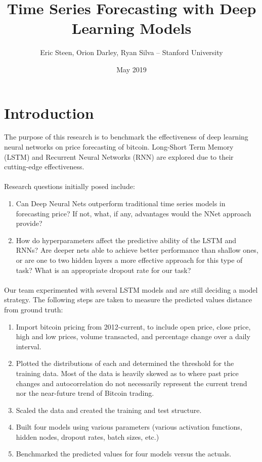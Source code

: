 \documentclass{article}
\title{Time Series Forecasting with Deep Learning Models}
\author{Eric Steen, Orion Darley, Ryan Silva – Stanford University }
\date{May 2019}
\begin{document}
\maketitle

\section{Introduction}
The purpose of this research is to benchmark the effectiveness of deep learning neural networks on price forecasting of bitcoin. Long-Short Term Memory (LSTM) and Recurrent Neural Networks (RNN) are explored due to their cutting-edge effectiveness.

\paragraph{}
Research questions initially posed include:
\begin{enumerate}
    \item Can Deep Neural Nets outperform traditional time series models in forecasting price? If not, what, if any, advantages would the NNet approach provide?
    \item How do hyperparameters affect the predictive ability of the LSTM and RNNs? Are deeper nets able to achieve better performance than shallow ones, or are one to two hidden layers a more effective approach for this type of task? What is an appropriate dropout rate for our task?
\end{enumerate}

\paragraph{}
Our team experimented with several LSTM models and are still deciding a model strategy. The following steps are taken to measure the predicted values distance from ground truth:

\begin{enumerate}
\item Import bitcoin pricing from 2012-current, to include open price, close price, high and low prices, volume transacted, and percentage change over a daily interval.
\item Plotted the distributions of each and determined the threshold for the training data. Most of the data is heavily skewed as to where past price changes and autocorrelation do not necessarily represent the current trend nor the near-future trend of Bitcoin trading.
\item Scaled the data and created the training and test structure.
\item Built four models using various parameters (various activation functions, hidden nodes, dropout rates, batch sizes, etc.)
\item Benchmarked the predicted values for four models versus the actuals.
\end{enumerate}
\end{document}
